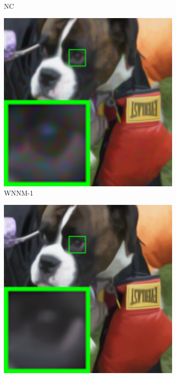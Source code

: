 \begin{figure}
\begin{subfigure}[t]{0.19\textwidth}
		\caption{NC}
    \end{subfigure}
    \hfill
    \begin{subfigure}[t]{0.19\textwidth}
        \centering
        \includegraphics[width=1\textwidth]{images/mcwnnm/resize_br_WNNM_dog.png}
		\caption{WNNM-1}
    \end{subfigure}
    \hfill
    \begin{subfigure}[t]{0.19\textwidth}
        \centering
        \includegraphics[width=1\textwidth]{images/mcwnnm/resize_br_WNNMJ_dog.png}

\end{subfigure}
\end{figure}
